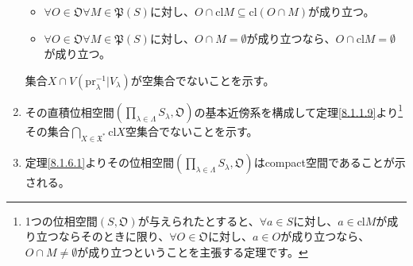 \documentclass[dvipdfmx]{jsarticle}
\begin{document}
\begin{enumerate}
{  \begin{itemize}
  \item
    $\forall O \in \mathfrak{O\forall}M \in \mathfrak{P}(S)$に対し、$O \cap {\mathrm{cl}}M \subseteq {\mathrm{cl}}(O \cap M)$が成り立つ。
  \item 
    $\forall O \in \mathfrak{O\forall}M \in \mathfrak{P}(S)$に対し、$O \cap M = \emptyset$が成り立つなら、$O \cap {\mathrm{cl}}M = \emptyset$が成り立つ。
  \end{itemize}}集合$X \cap V\left( {\mathrm{pr}}_{\lambda}^{- 1}|V_{\lambda} \right)$が空集合でないことを示す。
\item
  その直積位相空間$\left( \prod_{\lambda \in \varLambda} S_{\lambda},\mathfrak{O} \right)$の基本近傍系を構成して定理\ref{8.1.1.9}より\footnote{1つの位相空間$\left( S,\mathfrak{O} \right)$が与えられたとすると、$\forall a \in S$に対し、$a \in {\mathrm{cl}}M$が成り立つならそのときに限り、$\forall O \in \mathfrak{O}$に対し、$a \in O$が成り立つなら、$O \cap M \neq \emptyset$が成り立つということを主張する定理です。}その集合$\bigcap_{X \in \mathfrak{X}^{*}} {{\mathrm{cl}}X}$空集合でないことを示す。
\item
  定理\ref{8.1.6.1}よりその位相空間$\left( \prod_{\lambda \in \varLambda} S_{\lambda},\mathfrak{O} \right)$はcompact空間であることが示される。
\end{enumerate}
\end{document}
